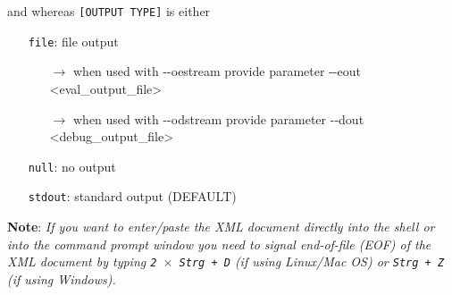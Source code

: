 \noindent and whereas \texttt{[OUTPUT TYPE]} is either
\begin{itemize}
  \setlength{\itemsep}{0pt}
  \item[] \texttt{file}: file output
  \begin{itemize}
    \setlength{\itemsep}{0pt}
    \item[$\rightarrow$] when used with {-}{-}oestream provide parameter {-}{-}eout <eval\_output\_file>
    \item[$\rightarrow$] when used with {-}{-}odstream provide parameter {-}{-}dout <debug\_output\_file>
  \end{itemize}
  \item[] \texttt{null}: no output
  \item[] \texttt{stdout}: standard output (DEFAULT)
\end{itemize}

\noindent \textbf{Note}: \emph{If you want to enter/paste the XML document directly into the shell or into the command prompt window you need to signal end-of-file (EOF) of the XML document by typing \texttt{2 $\times$ Strg + D} (if using Linux/Mac OS) or \texttt{Strg + Z} (if using Windows).} \\

